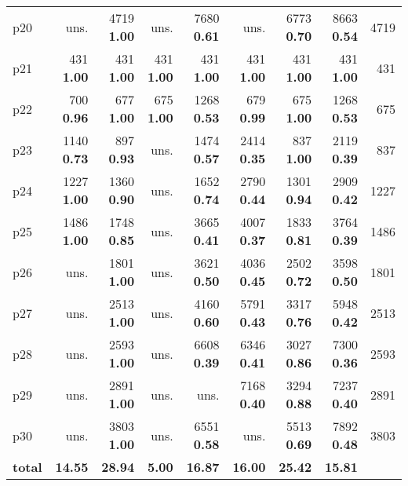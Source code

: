 \begin{tabular}{|l|rrrrrrr|r|}
p20 & uns. & {\footnotesize 4719} \textbf{1.00} & uns. & {\footnotesize 7680} \textbf{0.61} & uns. & {\footnotesize 6773} \textbf{0.70} & {\footnotesize 8663} \textbf{0.54} & 4719\\
p21 & {\footnotesize 431} \textbf{1.00} & {\footnotesize 431} \textbf{1.00} & {\footnotesize 431} \textbf{1.00} & {\footnotesize 431} \textbf{1.00} & {\footnotesize 431} \textbf{1.00} & {\footnotesize 431} \textbf{1.00} & {\footnotesize 431} \textbf{1.00} & 431\\
p22 & {\footnotesize 700} \textbf{0.96} & {\footnotesize 677} \textbf{1.00} & {\footnotesize 675} \textbf{1.00} & {\footnotesize 1268} \textbf{0.53} & {\footnotesize 679} \textbf{0.99} & {\footnotesize 675} \textbf{1.00} & {\footnotesize 1268} \textbf{0.53} & 675\\
p23 & {\footnotesize 1140} \textbf{0.73} & {\footnotesize 897} \textbf{0.93} & uns. & {\footnotesize 1474} \textbf{0.57} & {\footnotesize 2414} \textbf{0.35} & {\footnotesize 837} \textbf{1.00} & {\footnotesize 2119} \textbf{0.39} & 837\\
p24 & {\footnotesize 1227} \textbf{1.00} & {\footnotesize 1360} \textbf{0.90} & uns. & {\footnotesize 1652} \textbf{0.74} & {\footnotesize 2790} \textbf{0.44} & {\footnotesize 1301} \textbf{0.94} & {\footnotesize 2909} \textbf{0.42} & 1227\\
p25 & {\footnotesize 1486} \textbf{1.00} & {\footnotesize 1748} \textbf{0.85} & uns. & {\footnotesize 3665} \textbf{0.41} & {\footnotesize 4007} \textbf{0.37} & {\footnotesize 1833} \textbf{0.81} & {\footnotesize 3764} \textbf{0.39} & 1486\\
p26 & uns. & {\footnotesize 1801} \textbf{1.00} & uns. & {\footnotesize 3621} \textbf{0.50} & {\footnotesize 4036} \textbf{0.45} & {\footnotesize 2502} \textbf{0.72} & {\footnotesize 3598} \textbf{0.50} & 1801\\
p27 & uns. & {\footnotesize 2513} \textbf{1.00} & uns. & {\footnotesize 4160} \textbf{0.60} & {\footnotesize 5791} \textbf{0.43} & {\footnotesize 3317} \textbf{0.76} & {\footnotesize 5948} \textbf{0.42} & 2513\\
p28 & uns. & {\footnotesize 2593} \textbf{1.00} & uns. & {\footnotesize 6608} \textbf{0.39} & {\footnotesize 6346} \textbf{0.41} & {\footnotesize 3027} \textbf{0.86} & {\footnotesize 7300} \textbf{0.36} & 2593\\
p29 & uns. & {\footnotesize 2891} \textbf{1.00} & uns. & uns. & {\footnotesize 7168} \textbf{0.40} & {\footnotesize 3294} \textbf{0.88} & {\footnotesize 7237} \textbf{0.40} & 2891\\
p30 & uns. & {\footnotesize 3803} \textbf{1.00} & uns. & {\footnotesize 6551} \textbf{0.58} & uns. & {\footnotesize 5513} \textbf{0.69} & {\footnotesize 7892} \textbf{0.48} & 3803\\
\hline
\textbf{total} & \textbf{14.55} & \textbf{28.94} & \textbf{5.00} & \textbf{16.87} & \textbf{16.00} & \textbf{25.42} & \textbf{15.81} & \\
\hline
\end{tabular}

